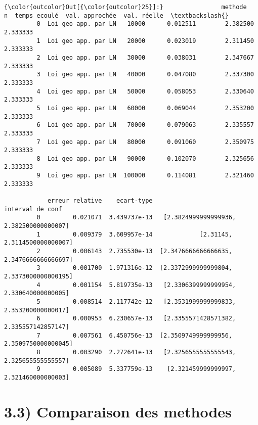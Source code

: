 \documentclass[11pt]{article}
\begin{document}
            \begin{Verbatim}[commandchars=\\\{\}]
{\color{outcolor}Out[{\color{outcolor}25}]:}                methode       n  temps ecoulé  val. approchée  val. réelle  \textbackslash{}
         0  Loi geo app. par LN   10000      0.012511        2.382500     2.333333   
         1  Loi geo app. par LN   20000      0.023019        2.311450     2.333333   
         2  Loi geo app. par LN   30000      0.038031        2.347667     2.333333   
         3  Loi geo app. par LN   40000      0.047080        2.337300     2.333333   
         4  Loi geo app. par LN   50000      0.058053        2.330640     2.333333   
         5  Loi geo app. par LN   60000      0.069044        2.353200     2.333333   
         6  Loi geo app. par LN   70000      0.079063        2.335557     2.333333   
         7  Loi geo app. par LN   80000      0.091060        2.350975     2.333333   
         8  Loi geo app. par LN   90000      0.102070        2.325656     2.333333   
         9  Loi geo app. par LN  100000      0.114081        2.321460     2.333333   
         
            erreur relative    ecart-type                          interval de conf  
         0         0.021071  3.439737e-13   [2.3824999999999936, 2.382500000000007]  
         1         0.009379  3.609957e-14             [2.31145, 2.3114500000000007]  
         2         0.006143  2.735530e-13  [2.3476666666666635, 2.3476666666666697]  
         3         0.001700  1.971316e-12  [2.3372999999999804, 2.3373000000000195]  
         4         0.001154  5.819735e-13   [2.3306399999999954, 2.330640000000005]  
         5         0.008514  2.117742e-12   [2.3531999999999833, 2.353200000000017]  
         6         0.000953  6.230657e-13   [2.3355571428571382, 2.335557142857147]  
         7         0.007561  6.450756e-13  [2.3509749999999956, 2.3509750000000045]  
         8         0.003290  2.272641e-13   [2.3256555555555543, 2.325655555555557]  
         9         0.005089  5.337759e-13    [2.321459999999997, 2.321460000000003]  
\end{Verbatim}
        
    \section{3.3) Comparaison des methodes}\label{comparaison-des-methodes}
\end{document}
